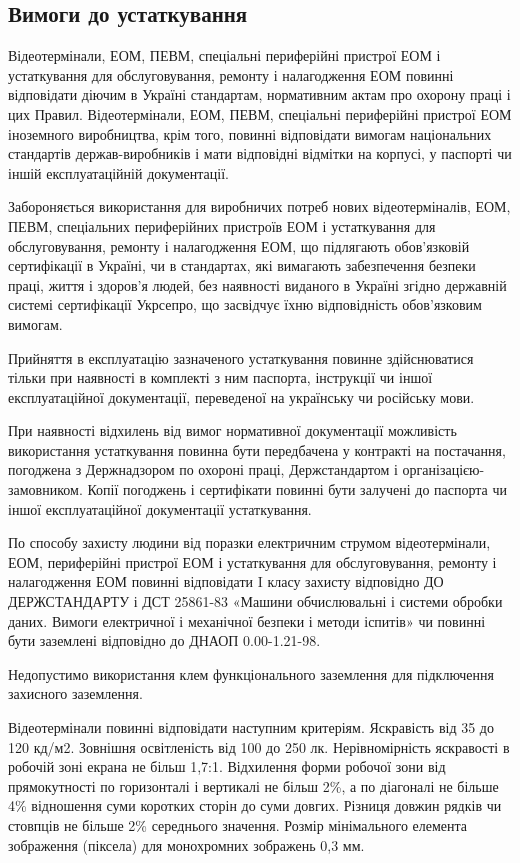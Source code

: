 \documentclass[simple,a4paper,14pt,ukrainian,utf8]{eskdtext}
\begin{document}
\begin{appendices}
            \subsection{Вимоги до устаткування}

                Відеотермінали, ЕОМ, ПЕВМ, спеціальні периферійні пристрої ЕОМ і устаткування для обслуговування, ремонту і налагодження ЕОМ повинні відповідати діючим в Україні стандартам, нормативним актам про охорону праці і цих Правил. Відеотермінали, ЕОМ, ПЕВМ, спеціальні периферійні пристрої ЕОМ іноземного виробництва, крім того, повинні відповідати вимогам національних стандартів держав-виробників і мати відповідні відмітки на корпусі, у паспорті чи іншій експлуатаційній документації.

                Забороняється використання для виробничих потреб нових відеотерміналів, ЕОМ, ПЕВМ, спеціальних периферійних пристроїв ЕОМ і устаткування для обслуговування, ремонту і налагодження ЕОМ, що підлягають обов'язковій сертифікації в Україні, чи в стандартах, які вимагають забезпечення безпеки праці, життя і здоров'я людей, без наявності виданого в Україні згідно державній системі сертифікації Укрсепро, що засвідчує їхню відповідність обов'язковим вимогам.

                Прийняття в експлуатацію зазначеного устаткування повинне здійснюватися тільки при наявності в комплекті з ним паспорта, інструкції чи іншої експлуатаційної документації, переведеної на українську чи російську мови.

                При наявності відхилень від вимог нормативної документації можливість використання устаткування повинна бути передбачена у контракті на постачання, погоджена з Держнадзором по охороні праці, Держстандартом і організацією-замовником. Копії погоджень і сертифікати повинні бути залучені до паспорта чи іншої експлуатаційної документації устаткування.

                По способу захисту людини від поразки електричним струмом відеотермінали, ЕОМ, периферійні пристрої ЕОМ і устаткування для обслуговування, ремонту і налагодження ЕОМ повинні відповідати I класу захисту відповідно ДО ДЕРЖСТАНДАРТУ і ДСТ 25861-83 «Машини обчислювальні і системи обробки даних. Вимоги електричної і механічної безпеки і методи іспитів» чи повинні бути заземлені відповідно до ДНАОП 0.00-1.21-98.

                Недопустимо використання клем функціонального заземлення для підключення захисного заземлення.

                Відеотермінали повинні відповідати наступним критеріям. Яскравість від 35 до 120 кд/м2. Зовнішня освітленість від 100 до 250 лк. Нерівномірність яскравості в робочій зоні екрана не більш 1,7:1. Відхилення форми робочої зони від прямокутності по горизонталі і вертикалі не більш 2\%, а по діагоналі не більше 4\% відношення суми коротких сторін до суми довгих. Різниця довжин рядків чи стовпців не більше 2\% середнього значення. Розмір мінімального елемента зображення (піксела) для монохромних зображень 0,3 мм.


\end{appendices}
\end{document}
